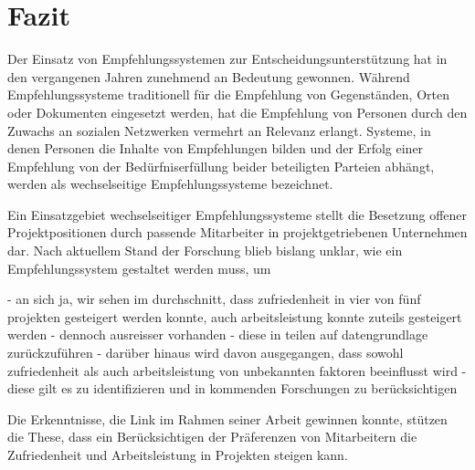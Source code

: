 
\chapter{Fazit}
\label{ch:fazit}
Der Einsatz von Empfehlungssystemen zur Entscheidungsunterstützung hat in den vergangenen Jahren zunehmend an Bedeutung gewonnen.
Während Empfehlungssysteme traditionell für die Empfehlung von Gegenständen, Orten oder Dokumenten eingesetzt werden, hat die Empfehlung von Personen durch den Zuwachs an sozialen Netzwerken vermehrt an Relevanz erlangt.
Systeme, in denen Personen die Inhalte von Empfehlungen bilden und der Erfolg einer Empfehlung von der Bedürfniserfüllung beider beteiligten Parteien abhängt, werden als wechselseitige Empfehlungssysteme bezeichnet.

Ein Einsatzgebiet wechselseitiger Empfehlungssysteme stellt die Besetzung offener Projektpositionen durch passende Mitarbeiter in projektgetriebenen Unternehmen dar.
Nach aktuellem Stand der Forschung blieb bislang unklar, wie ein Empfehlungssystem gestaltet werden muss, um

- an sich ja, wir sehen im durchschnitt, dass zufriedenheit in vier von fünf projekten gesteigert werden konnte, auch arbeitsleistung konnte zuteils gesteigert werden
- dennoch ausreisser vorhanden
- diese in teilen auf datengrundlage zurückzuführen
- darüber hinaus wird davon ausgegangen, dass sowohl zufriedenheit als auch arbeitsleistung von unbekannten faktoren beeinflusst wird
- diese gilt es zu identifizieren und in kommenden Forschungen zu berücksichtigen


Die Erkenntnisse, die Link im Rahmen seiner Arbeit gewinnen konnte, stützen die These, dass ein Berücksichtigen der Präferenzen von Mitarbeitern die Zufriedenheit und Arbeitsleistung in Projekten steigen kann.

